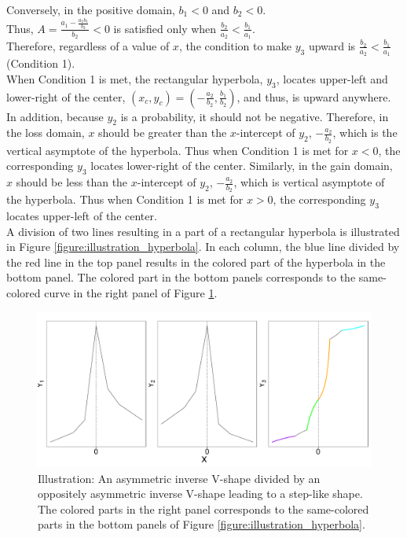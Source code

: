 \documentclass[11pt, a4paper]{article}
\begin{document}
\noindent
Conversely, in the positive domain, $b_1<0$ and $b_2<0$.\\
Thus, $A = \frac{a_1-\frac{a_2 b_1}{b_2}}{b_2}<0$ is satisfied only when $\frac{b_2}{a_2} < \frac{b_1}{a_1}$.\\

\noindent
Therefore, regardless of a value of $x$, the condition to make $y_3$ upward is $\frac{b_2}{a_2} < \frac{b_1}{a_1}$  (Condition 1).\\

\noindent
When Condition 1 is met, the rectangular hyperbola, $y_3$, locates upper-left and lower-right of the center, $(x_c, y_c) = (-\frac{a_2}{b_2}, \frac{b_1}{b_2})$, and thus, is upward anywhere.\\

\noindent
In addition, because $y_2$ is a probability, it should not be negative. Therefore, in the loss domain, $x$ should be greater than the $x$-intercept of $y_2$, $-\frac{a_2}{b_2}$, which is the vertical asymptote of the hyperbola. Thus when Condition 1 is met for $x<0$, the corresponding $y_3$ locates lower-right of the center.
Similarly, in the gain domain, $x$ should be less than the $x$-intercept of $y_2$, $-\frac{a_2}{b_2}$, which is vertical asymptote of the hyperbola. Thus when Condition 1 is met for $x>0$, the corresponding $y_3$ locates upper-left of the center.\\ 


\noindent
A division of two lines resulting in a part of a rectangular hyperbola is illustrated in Figure \ref{figure:illustration_hyperbola}. In each column, the blue line divided by the red line in the top panel results in the colored part of the hyperbola in the bottom panel. The colored part in the bottom panels corresponds to the same-colored curve in the right panel of Figure \ref{figure:illustration_color}.

\begin{figure}[H]
	\centering
	\includegraphics[width=0.9\columnwidth]{illustration_color.pdf}
	\caption{\small Illustration: An asymmetric inverse V-shape divided by an oppositely asymmetric inverse V-shape leading to a step-like shape. The colored parts in the right panel corresponds to the same-colored parts in the bottom panels of Figure \ref{figure:illustration_hyperbola}.}
	\label{figure:illustration_color}
\end{figure}
\end{document}
